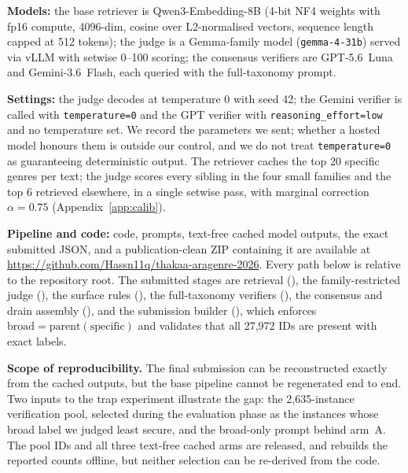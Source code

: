 \documentclass[11pt]{article}
\begin{document}
\textbf{Models:} the base retriever is Qwen3-Embedding-8B (4-bit NF4
weights with fp16 compute, 4096-dim, cosine over L2-normalised vectors, sequence length
capped at 512 tokens); the judge is a Gemma-family model
(\texttt{gemma-4-31b}) served via vLLM with setwise 0--100 scoring; the consensus verifiers
are GPT-5.6~Luna and Gemini-3.6~Flash, each queried with the full-taxonomy prompt.

\textbf{Settings:} the judge decodes at temperature 0 with seed 42; the Gemini verifier is
called with \texttt{temperature=0} and the GPT verifier with \texttt{reasoning\_effort=low} and
no temperature set. We record the parameters we sent; whether a hosted model honours them is outside our control,
and we do not treat \texttt{temperature=0} as guaranteeing deterministic output.
The retriever caches the top 20 specific genres per text; the judge scores every sibling in the
four small families and the top 6 retrieved elsewhere, in a single setwise pass, with marginal
correction $\alpha{=}0.75$ (Appendix~\ref{app:calib}).

\textbf{Pipeline and code:} code, prompts, text-free cached model outputs, the exact submitted
JSON, and a publication-clean ZIP containing it are available at
\url{https://github.com/Hassn11q/thakaa-aragenre-2026}. Every path below is relative to the
repository root. The submitted stages are retrieval (), the
family-restricted judge (), the surface rules
(), the full-taxonomy verifiers
(), the consensus and drain assembly
(), and the submission builder
(), which enforces
$\text{broad}{=}\text{parent}(\text{specific})$ and validates that all 27{,}972 IDs are
present with exact labels.

\textbf{Scope of reproducibility.} The final submission can be reconstructed exactly from the
cached outputs, but the base pipeline cannot be regenerated end to end. Two inputs to the trap
experiment illustrate the gap: the 2{,}635-instance verification pool, selected during the
evaluation phase as the instances whose broad label we judged least secure, and the broad-only
prompt behind arm~A. The pool IDs and all three text-free cached arms are released, and
 rebuilds the reported counts offline, but
neither selection can be re-derived from the code.
\end{document}
